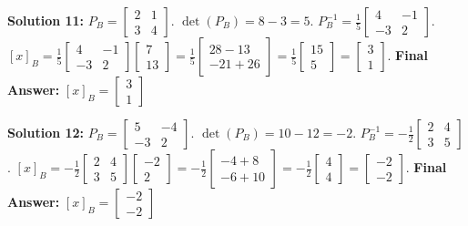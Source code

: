 \documentclass{article}
\begin{document}
\vspace{0.3cm}
\textbf{Solution 11:} $P_B = \begin{bmatrix} 2 & 1 \\ 3 & 4 \end{bmatrix}$. $\det(P_B) = 8 - 3 = 5$.
$P_B^{-1} = \frac{1}{5} \begin{bmatrix} 4 & -1 \\ -3 & 2 \end{bmatrix}$.
$[x]_B = \frac{1}{5} \begin{bmatrix} 4 & -1 \\ -3 & 2 \end{bmatrix} \begin{bmatrix} 7 \\ 13 \end{bmatrix} = \frac{1}{5} \begin{bmatrix} 28 - 13 \\ -21 + 26 \end{bmatrix} = \frac{1}{5} \begin{bmatrix} 15 \\ 5 \end{bmatrix} = \begin{bmatrix} 3 \\ 1 \end{bmatrix}$.
\textbf{Final Answer:} $[x]_B = \begin{bmatrix} 3 \\ 1 \end{bmatrix}$

\vspace{0.3cm}
\textbf{Solution 12:} $P_B = \begin{bmatrix} 5 & -4 \\ -3 & 2 \end{bmatrix}$. $\det(P_B) = 10 - 12 = -2$.
$P_B^{-1} = -\frac{1}{2} \begin{bmatrix} 2 & 4 \\ 3 & 5 \end{bmatrix}$.
$[x]_B = -\frac{1}{2} \begin{bmatrix} 2 & 4 \\ 3 & 5 \end{bmatrix} \begin{bmatrix} -2 \\ 2 \end{bmatrix} = -\frac{1}{2} \begin{bmatrix} -4 + 8 \\ -6 + 10 \end{bmatrix} = -\frac{1}{2} \begin{bmatrix} 4 \\ 4 \end{bmatrix} = \begin{bmatrix} -2 \\ -2 \end{bmatrix}$.
\textbf{Final Answer:} $[x]_B = \begin{bmatrix} -2 \\ -2 \end{bmatrix}$
\end{document}

